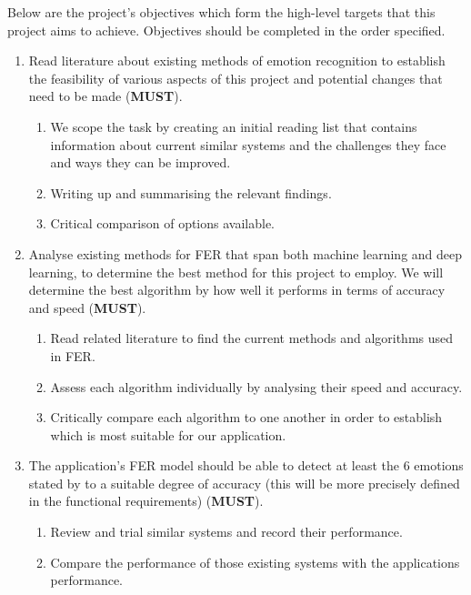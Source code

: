\documentclass[12pt, a4paper]{article}
\newcommand{\np}
    {
    \vskip 0.4cm
    }
\begin{document}
Below are the project's objectives which form the high-level targets that this project aims to achieve. Objectives should be completed in the order specified.
\np

\begin{enumerate}

    \item Read literature about existing methods of emotion recognition to establish the feasibility of various aspects of this project and potential changes that need to be made (\textbf{MUST}).
        \begin{enumerate}
            \item We scope the task by creating an initial reading list that contains information about current similar systems and the challenges they face and ways they can be improved.
            \item Writing up and summarising the relevant findings.
            \item Critical comparison of options available.
        \end{enumerate}


    \item Analyse existing methods for FER that span both machine learning and deep learning, to determine the best method for this project to employ. We will determine the best algorithm by how well it performs in terms of accuracy and speed (\textbf{MUST}).
		\begin{enumerate}
		 	\item Read related literature to find the current methods and algorithms used in FER.
		 	\item Assess each algorithm individually by analysing their speed and accuracy.
		 	\item Critically compare each algorithm to one another in order to establish which is most suitable for our application.
		\end{enumerate}

	
	\item The application's FER model should be able to detect at least the 6 emotions stated by \cite{ekman} to a suitable degree of accuracy (this will be more precisely defined in the functional requirements) (\textbf{MUST}).
		\begin{enumerate}
		 	\item Review and trial similar systems and record their performance.
		 	\item Compare the performance of those existing systems with the applications performance.
		\end{enumerate}


\end{enumerate}
\end{document}
